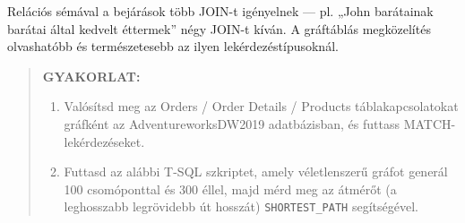 \documentclass[
  magyar,
]{article}
\providecommand{\tightlist}{%
  \setlength{\itemsep}{0pt}\setlength{\parskip}{0pt}}
\begin{document}
Relációs sémával a bejárások több JOIN-t igényelnek --- pl. „John
barátainak barátai által kedvelt éttermek'' négy JOIN-t kíván. A
gráftáblás megközelítés olvashatóbb és természetesebb az ilyen
lekérdezéstípusoknál.

\begin{quote}
\textbf{GYAKORLAT:}

\begin{enumerate}
\def\labelenumi{\arabic{enumi}.}
\tightlist
\item
  Valósítsd meg az Orders / Order Details / Products táblakapcsolatokat
  gráfként az AdventureworksDW2019 adatbázisban, és futtass
  MATCH-lekérdezéseket.
\item
  Futtasd az alábbi T-SQL szkriptet, amely véletlenszerű gráfot generál
  100 csomóponttal és 300 éllel, majd mérd meg az átmérőt (a leghosszabb
  legrövidebb út hosszát) \texttt{SHORTEST\_PATH} segítségével.
\end{enumerate}
\end{quote}
\end{document}
